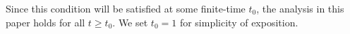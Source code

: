 Since this condition will be satisfied at some finite-time $t_0$, the analysis in this paper holds for all $t \geq t_0.$ We set $t_0 = 1$ for simplicity of exposition.




